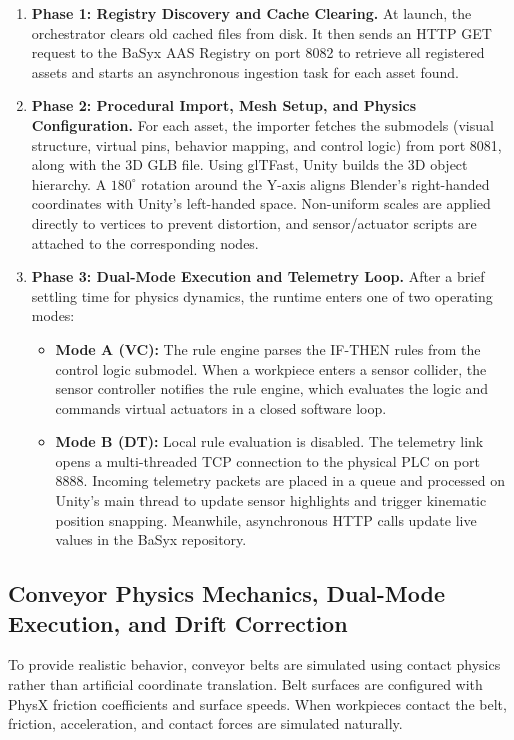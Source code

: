 \begin{enumerate}
    \item \textbf{Phase 1: Registry Discovery and Cache Clearing.} At launch, the orchestrator clears old cached files from disk. It then sends an \gls{HTTP} GET request to the BaSyx \gls{AAS} Registry on port 8082 to retrieve all registered assets and starts an asynchronous ingestion task for each asset found.
    \item \textbf{Phase 2: Procedural Import, Mesh Setup, and Physics Configuration.} For each asset, the importer fetches the submodels (visual structure, virtual pins, behavior mapping, and control logic) from port 8081, along with the 3D \gls{GLB} file. Using glTFast, Unity builds the 3D object hierarchy. A $180^\circ$ rotation around the Y-axis aligns Blender's right-handed coordinates with Unity's left-handed space. Non-uniform scales are applied directly to vertices to prevent distortion, and sensor/actuator scripts are attached to the corresponding nodes.
    \item \textbf{Phase 3: Dual-Mode Execution and Telemetry Loop.} After a brief settling time for physics dynamics, the runtime enters one of two operating modes:
    \begin{itemize}
        \item \textbf{Mode A (\gls{VC}):} The rule engine parses the IF-THEN rules from the control logic submodel. When a workpiece enters a sensor collider, the sensor controller notifies the rule engine, which evaluates the logic and commands virtual actuators in a closed software loop.
        \item \textbf{Mode B (\gls{DT}):} Local rule evaluation is disabled. The telemetry link opens a multi-threaded \gls{TCP} connection to the physical \gls{PLC} on port 8888. Incoming telemetry packets are placed in a queue and processed on Unity's main thread to update sensor highlights and trigger kinematic position snapping. Meanwhile, asynchronous \gls{HTTP} calls update live values in the BaSyx repository.
    \end{itemize}
\end{enumerate}

\subsection{Conveyor Physics Mechanics, Dual-Mode Execution, and Drift Correction}
\label{subsec:unity_runtime_physics}

To provide realistic behavior, conveyor belts are simulated using contact physics rather than artificial coordinate translation. Belt surfaces are configured with PhysX friction coefficients and surface speeds. When workpieces contact the belt, friction, acceleration, and contact forces are simulated naturally.

